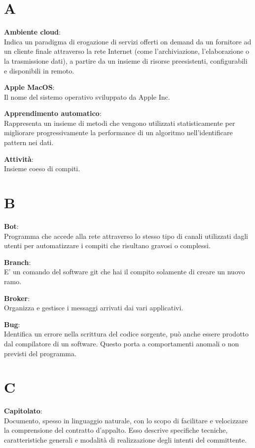 \documentclass[a4paper, oneside, openany, dvipsnames, table]{article}
\begin{document}
\copertina{}


\newpage
\tableofcontents
\newpage


\newpage
\section{A}
\textbf{Ambiente cloud}:\\	 Indica un paradigma di erogazione di servizi offerti on demand da un fornitore ad un cliente finale attraverso la rete Internet (come l'archiviazione, l'elaborazione o la trasmissione dati), a partire da un insieme di risorse preesistenti, configurabili e disponibili in remoto.

\textbf{Apple MacOS}:\\Il nome del sistemo operativo sviluppato da Apple Inc.

\textbf{Apprendimento automatico}:\\	Rappresenta un insieme di metodi che vengono utilizzati statisticamente per migliorare progressivamente la performance di un algoritmo nell'identificare pattern nei dati.

\textbf{Attività}:\\	Insieme coeso di compiti.


\newpage
\section{B}
\textbf{Bot}:\\	Programma che accede alla rete attraverso lo stesso tipo di 
canali utilizzati dagli utenti per automatizzare i compiti che risultano gravosi o complessi.

\textbf{Branch}:\\	E' un comando del software git che hai il compito solamente di creare un nuovo ramo.

\textbf{Broker}:\\	 Organizza e gestisce i messaggi arrivati dai vari applicativi.

\textbf{Bug}:\\	Identifica un errore nella scrittura del codice sorgente, può anche essere prodotto dal compilatore di un software. Questo porta a comportamenti anomali o non previsti del programma.


\newpage
\section{C}
\textbf{Capitolato}:\\	Documento, spesso in linguaggio naturale, con lo scopo di facilitare e velocizzare la comprensione del contratto d'appalto. Esso descrive specifiche tecniche, caratteristiche generali e modalità di realizzazione degli intenti del committente.
\end{document}
